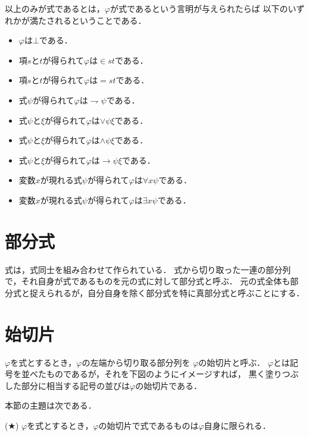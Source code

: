 \documentclass[a4j,10.5pt,oneside,openany]{jsbook}
\begin{document}
	以上のみが式であるとは，$\varphi$が式であるという言明が与えられたらば
	以下のいずれかが満たされるということである．
	\begin{itemize}
		\item $\varphi$は$\bot$である．
		\item 項$s$と$t$が得られて$\varphi$は$\in s t$である．
		\item 項$s$と$t$が得られて$\varphi$は$= s t$である．
		\item 式$\psi$が得られて$\varphi$は$\rightharpoondown \psi$である．
		\item 式$\psi$と$\xi$が得られて$\varphi$は$\vee \psi \xi$である．
		\item 式$\psi$と$\xi$が得られて$\varphi$は$\wedge \psi \xi$である．
		\item 式$\psi$と$\xi$が得られて$\varphi$は$\rightarrow \psi \xi$である．
		\item 変数$x$が現れる式$\psi$が得られて$\varphi$は$\forall x \psi$である．
		\item 変数$x$が現れる式$\psi$が得られて$\varphi$は$\exists x \psi$である．
	\end{itemize}
	
\section{部分式}
	式は，式同士を組み合わせて作られている．
	式から切り取った一連の部分列で，それ自身が式であるものを元の式に対して部分式と呼ぶ．
	元の式全体も部分式と捉えられるが，自分自身を除く部分式を特に真部分式と呼ぶことにする．
	
\section{始切片}
	$\varphi$を式とするとき，$\varphi$の左端から切り取る部分列を
	$\varphi$の始切片と呼ぶ．
	$\varphi$とは記号を並べたものであるが，それを下図のようにイメージすれば，
	黒く塗りつぶした部分に相当する記号の並びは$\varphi$の始切片である．
	
	\begin{center}
	\end{center}
	
	本節の主題は次である．
	\begin{screen}
		(★) $\varphi$を式とするとき，$\varphi$の始切片で式であるものは$\varphi$自身に限られる．
	\end{screen}
	
\end{document}
